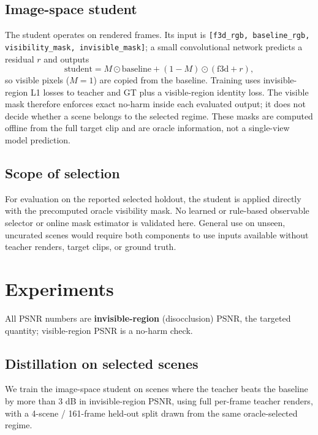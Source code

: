 \documentclass[10pt,twocolumn,letterpaper]{article}
\begin{document}
\subsection{Image-space student}
The student operates on rendered frames. Its input is
\texttt{[f3d\_rgb, baseline\_rgb, visibility\_mask, invisible\_mask]}; a small
convolutional network predicts a residual $r$ and outputs
\[
\text{student} = M\odot\text{baseline} + (1-M)\odot(\text{f3d}+r),
\]
so visible pixels ($M{=}1$) are copied from the baseline. Training uses
invisible-region L1 losses to teacher and GT plus a visible-region identity loss.
The visible mask therefore enforces exact no-harm inside each evaluated output;
it does not decide whether a scene belongs to the selected regime. These masks
are computed offline from the full target clip and are oracle information, not a
single-view model prediction.

\subsection{Scope of selection}
For evaluation on the reported selected holdout, the student is applied directly
with the precomputed oracle visibility mask. No learned or rule-based observable
selector or online mask estimator is validated here. General use on unseen,
uncurated scenes would require both components to use inputs available without
teacher renders, target clips, or ground truth.

\section{Experiments}
\label{sec:exp}
All PSNR numbers are \textbf{invisible-region} (disocclusion) PSNR, the targeted
quantity; visible-region PSNR is a no-harm check.

\subsection{Distillation on selected scenes}
We train the image-space student on scenes where the teacher beats the baseline
by more than 3 dB in invisible-region PSNR, using full per-frame teacher renders,
with a 4-scene / 161-frame held-out split drawn from the same oracle-selected
regime.
\end{document}
